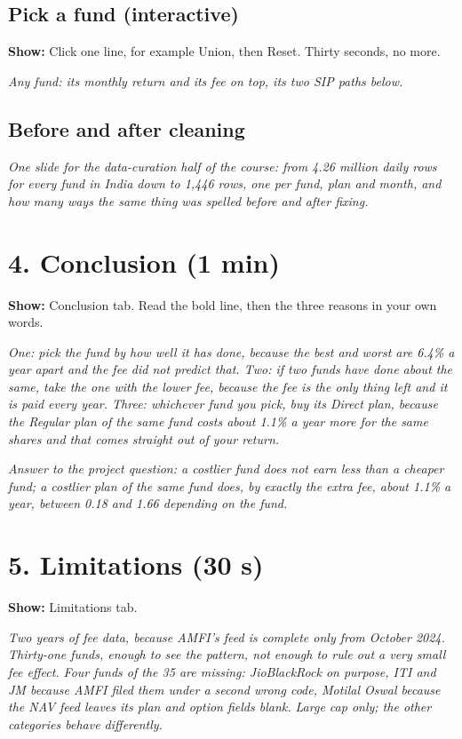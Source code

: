 \documentclass[11pt,a4paper]{article}
\newcommand{\say}[1]{\par\medskip\noindent\textcolor{black!70}{\textit{#1}}\par\medskip}
\newcommand{\onscreen}[1]{\noindent\textbf{Show:} #1\par}
\begin{document}
\subsection*{Pick a fund (interactive)}
\onscreen{Click one line, for example Union, then Reset. Thirty seconds, no more.}
\say{Any fund: its monthly return and its fee on top, its two SIP paths below.}

\subsection*{Before and after cleaning}
\say{One slide for the data-curation half of the course: from 4.26 million daily rows for every fund in India down to 1,446 rows, one per fund, plan and month, and how many ways the same thing was spelled before and after fixing.}

\section*{4. Conclusion (1 min)}
\onscreen{Conclusion tab. Read the bold line, then the three reasons in your own words.}
\say{One: pick the fund by how well it has done, because the best and worst are 6.4\% a year apart and the fee did not predict that. Two: if two funds have done about the same, take the one with the lower fee, because the fee is the only thing left and it is paid every year. Three: whichever fund you pick, buy its Direct plan, because the Regular plan of the same fund costs about 1.1\% a year more for the same shares and that comes straight out of your return.}
\say{Answer to the project question: a costlier fund does not earn less than a cheaper fund; a costlier plan of the same fund does, by exactly the extra fee, about 1.1\% a year, between 0.18 and 1.66 depending on the fund.}

\section*{5. Limitations (30 s)}
\onscreen{Limitations tab.}
\say{Two years of fee data, because AMFI's feed is complete only from October 2024. Thirty-one funds, enough to see the pattern, not enough to rule out a very small fee effect. Four funds of the 35 are missing: JioBlackRock on purpose, ITI and JM because AMFI filed them under a second wrong code, Motilal Oswal because the NAV feed leaves its plan and option fields blank. Large cap only; the other categories behave differently.}
\end{document}
